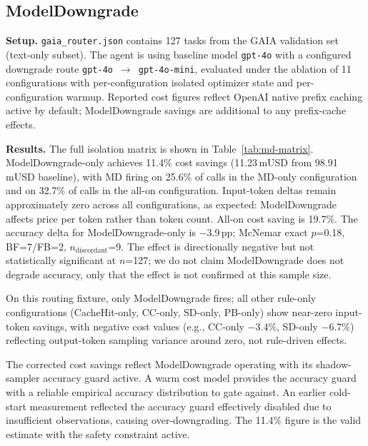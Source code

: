 \documentclass[sigconf,9pt]{acmart}
\begin{document}
\subsection{ModelDowngrade}
\label{sec:eval-md}

\textbf{Setup.} \texttt{gaia\_router.json} contains 127 tasks from the GAIA
validation set (text-only subset). The agent is 
using baseline model \texttt{gpt-4o} with a configured downgrade route
\texttt{gpt-4o}~$\rightarrow$~\texttt{gpt-4o-mini}, evaluated under the ablation of
11 configurations with per-configuration isolated optimizer state and per-configuration
warmup. Reported cost figures reflect OpenAI native prefix caching active by default;
ModelDowngrade savings are additional to any prefix-cache effects.

\textbf{Results.} The full isolation matrix is shown in Table~\ref{tab:md-matrix}.
ModelDowngrade-only achieves 11.4\% cost savings (11.23\,mUSD from 98.91\,mUSD
baseline), with MD firing on 25.6\% of calls in the MD-only configuration and on
32.7\% of calls in the all-on configuration. Input-token deltas remain approximately
zero across all configurations, as expected: ModelDowngrade affects price per token
rather than token count. All-on cost saving is 19.7\%. The accuracy delta for
ModelDowngrade-only is $-$3.9\,pp; McNemar exact $p$=0.18, BF=7/FB=2,
$n_{\mathrm{discordant}}$=9. The effect is directionally negative but not
statistically significant at $n$=127; we do not claim ModelDowngrade does not degrade
accuracy, only that the effect is not confirmed at this sample size.

On this routing fixture, only ModelDowngrade fires; all other rule-only
configurations (CacheHit-only, CC-only, SD-only, PB-only) show near-zero input-token
savings, with negative cost values (e.g., CC-only $-$3.4\%, SD-only $-$6.7\%)
reflecting output-token sampling variance around zero, not rule-driven effects.

The corrected cost savings reflect ModelDowngrade operating with its shadow-sampler
accuracy guard active. A warm cost model provides the accuracy guard with a reliable
empirical accuracy distribution to gate against. An earlier cold-start measurement
reflected the accuracy guard effectively disabled due to insufficient observations,
causing over-downgrading. The 11.4\% figure is the valid estimate with the safety
constraint active.
\end{document}
